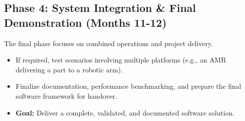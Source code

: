 \subsection{Phase 4: System Integration \& Final Demonstration (Months 11-12)}
The final phase focuses on combined operations and project delivery.
\begin{itemize}
    \item If required, test scenarios involving multiple platforms (e.g., an AMR delivering a part to a robotic arm).
    \item Finalize documentation, performance benchmarking, and prepare the final software framework for handover.
    \item \textbf{Goal:} Deliver a complete, validated, and documented software solution.
\end{itemize}